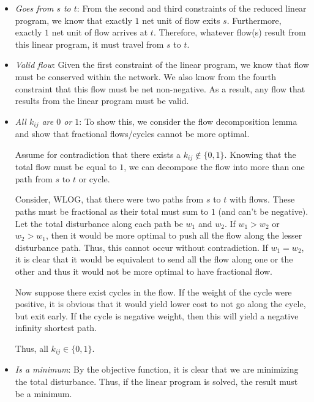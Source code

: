 \documentclass[12pt,twoside]{article}
\begin{document}
\begin{problems}
\begin{problemparts}
\begin{itemize}

  \item {\it Goes from $s$ to $t$}: From the second and third constraints of
  the reduced linear program, we know that exactly $1$ net unit of flow exits
  $s$. Furthermore, exactly $1$ net unit of flow arrives at $t$. Therefore,
  whatever flow(s) result from this linear program, it must travel from $s$
  to $t$.

  \item {\it Valid flow}: Given the first constraint of the linear program,
  we know that flow must be conserved within the network. We also know from
  the fourth constraint that this flow must be net non-negative. As a result,
  any flow that results from the linear program must be valid.

  \item {\it All $k_{ij}$ are $0$ or $1$}: To show this, we consider the flow
  decomposition lemma and show that fractional flows/cycles cannot be more
  optimal.
  
  Assume for contradiction that there exists a $k_{ij} \not\in \{0, 1\}$.
  Knowing that the total flow must be equal to $1$, we can decompose the flow
  into more than one path from $s$ to $t$ or cycle.

  Consider, WLOG, that there were two paths from $s$ to $t$ with flows. These
  paths must be fractional as their total must sum to $1$ (and can't be
  negative). Let the total disturbance along each path be $w_1$ and $w_2$. If
  $w_1 > w_2$ or $w_2 > w_1$, then it would be more optimal to push all the
  flow along the lesser disturbance path. Thus, this cannot occur without
  contradiction. If $w_1 = w_2$, it is clear that it would be equivalent to
  send all the flow along one or the other and thus it would not be more
  optimal to have fractional flow.

  Now suppose there exist cycles in the flow. If the weight of the cycle were
  positive, it is obvious that it would yield lower cost to not go along the
  cycle, but exit early. If the cycle is negative weight, then this will
  yield a negative infinity shortest path.

  Thus, all $k_{ij} \in \{0, 1\}$.

  \item {\it Is a minimum}: By the objective function, it is clear that we
  are minimizing the total disturbance. Thus, if the linear program is
  solved, the result must be a minimum.


\end{itemize}
\end{problemparts}
\end{problems}
\end{document}
